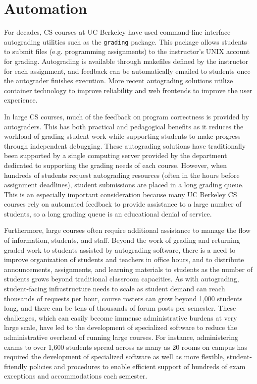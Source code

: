 \chapter{Automation}
\label{chapter:automation}

For decades, CS courses at UC Berkeley have used command-line interface autograding utilities such as the \texttt{grading} package. This package allows students to submit files (e.g. programming assignments) to the instructor's UNIX account for grading. Autograding is available through makefiles defined by the instructor for each assignment, and feedback can be automatically emailed to students once the autograder finishes execution. More recent autograding solutions utilize container technology to improve reliability and web frontends to improve the user experience.

In large CS courses, much of the feedback on program correctness is provided by autograders. This has both practical and pedagogical benefits as it reduces the workload of grading student work while supporting students to make progress through independent debugging. These autograding solutions have traditionally been supported by a single computing server provided by the department dedicated to supporting the grading needs of each course. However, when hundreds of students request autograding resources (often in the hours before assignment deadlines), student submissions are placed in a long grading queue. This is an especially important consideration because many UC Berkeley CS courses rely on automated feedback to provide assistance to a large number of students, so a long grading queue is an educational denial of service.

Furthermore, large courses often require additional assistance to manage the flow of information, students, and staff. Beyond the work of grading and returning graded work to students assisted by autograding software, there is a need to improve organization of students and teachers in office hours, and to distribute announcements, assignments, and learning materials to students as the number of students grows beyond traditional classroom capacities. As with autograding, student-facing infrastructure needs to scale as student demand can reach thousands of requests per hour, course rosters can grow beyond 1,000 students long, and there can be tens of thousands of forum posts per semester. These challenges, which can easily become immense administrative burdens at very large scale, have led to the development of specialized software to reduce the administrative overhead of running large courses. For instance, administering exams to over 1,600 students spread across as many as 20 rooms on campus has required the development of specialized software as well as more flexible, student-friendly policies and procedures to enable efficient support of hundreds of exam exceptions and accommodations each semester.


